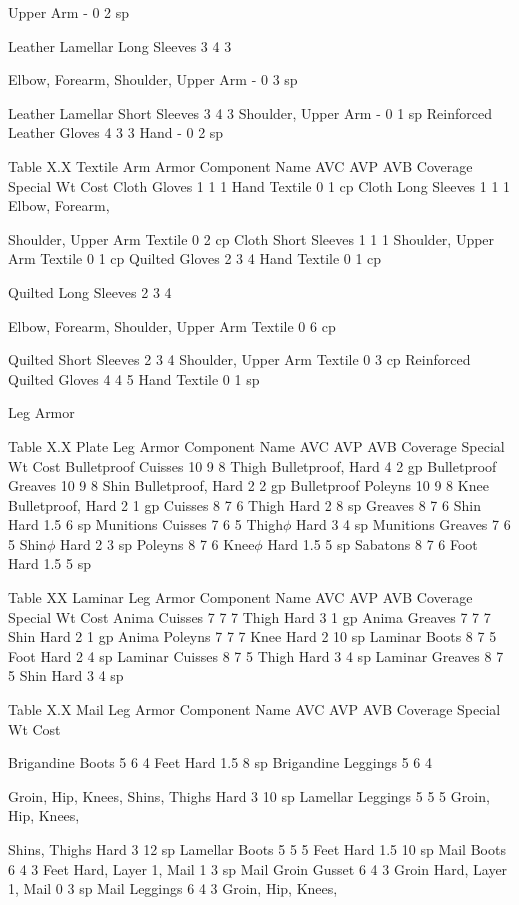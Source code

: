 \documentclass[oneside,11pt,english]{book}
\begin{document}
Upper Arm - 0 2 sp

Leather Lamellar 
Long Sleeves 3 4 3

Elbow, Forearm, Shoulder,
Upper Arm - 0 3 sp

Leather Lamellar 
Short Sleeves 3 4 3 Shoulder, Upper Arm - 0 1 sp
Reinforced Leather
Gloves 4 3 3 Hand - 0 2 sp

Table X.X Textile Arm Armor
Component Name AVC AVP AVB Coverage Special Wt Cost
Cloth Gloves 1 1 1 Hand Textile 0 1 cp
Cloth Long Sleeves 1 1 1 Elbow, Forearm, 

Shoulder, Upper Arm Textile 0 2 cp
Cloth Short Sleeves 1 1 1 Shoulder, Upper Arm Textile 0 1 cp
Quilted Gloves 2 3 4 Hand Textile 0 1 cp


Quilted Long 
Sleeves 2 3 4

Elbow, Forearm, 
Shoulder, Upper Arm Textile 0 6 cp

Quilted Short 
Sleeves 2 3 4 Shoulder, Upper Arm Textile 0 3 cp
Reinforced Quilted 
Gloves 4 4 5 Hand Textile 0 1 sp

Leg Armor

Table X.X Plate Leg Armor
Component Name AVC AVP AVB Coverage Special Wt Cost
Bulletproof Cuisses 10 9 8 Thigh Bulletproof, Hard 4 2 gp
Bulletproof 
Greaves 10 9 8 Shin Bulletproof, Hard 2 2 gp
Bulletproof 
Poleyns 10 9 8 Knee Bulletproof, Hard 2 1 gp
Cuisses 8 7 6 Thigh Hard 2 8 sp
Greaves 8 7 6 Shin Hard 1.5 6 sp
Munitions Cuisses 7 6 5 Thigh$\phi$ Hard 3 4 sp
Munitions Greaves 7 6 5 Shin$\phi$ Hard 2 3 sp
Poleyns 8 7 6 Knee$\phi$ Hard 1.5 5 sp
Sabatons 8 7 6 Foot Hard 1.5 5 sp

Table XX Laminar Leg Armor
Component Name AVC AVP AVB Coverage Special Wt Cost
Anima Cuisses 7 7 7 Thigh Hard 3 1 gp
Anima Greaves 7 7 7 Shin Hard 2 1 gp
Anima Poleyns 7 7 7 Knee Hard 2 10 sp
Laminar Boots 8 7 5 Foot Hard 2 4 sp
Laminar Cuisses 8 7 5 Thigh Hard 3 4 sp
Laminar Greaves 8 7 5 Shin Hard 3 4 sp

Table X.X Mail Leg Armor
Component Name AVC AVP AVB Coverage Special Wt Cost


Brigandine Boots 5 6 4 Feet Hard 1.5 8 sp
Brigandine 
Leggings 5 6 4

Groin, Hip, Knees, 
Shins, Thighs Hard 3 10 sp
Lamellar Leggings 5 5 5 Groin, Hip, Knees, 

Shins, Thighs Hard 3 12 sp
Lamellar Boots 5 5 5 Feet Hard 1.5 10 sp
Mail Boots 6 4 3 Feet Hard, Layer 1, Mail 1 3 sp
Mail Groin
Gusset 6 4 3 Groin Hard, Layer 1, Mail 0 3 sp
Mail Leggings 6 4 3 Groin, Hip, Knees, 
\end{document}
